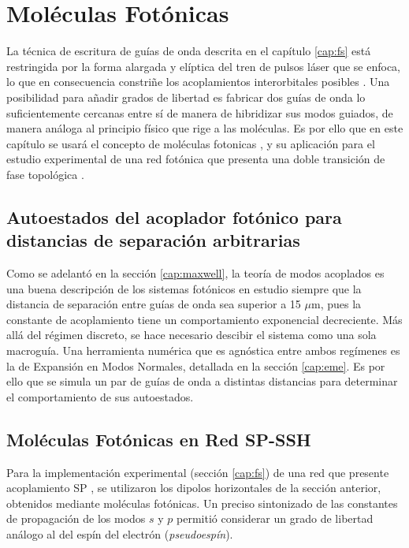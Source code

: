 \chapter{Moléculas Fotónicas}

La técnica de escritura de guías de onda descrita en el capítulo \ref{cap:fs} está restringida por la forma alargada y elíptica del tren de pulsos láser que se enfoca, lo que en consecuencia constriñe los acoplamientos interorbitales posibles \citep{interorbital}. Una posibilidad para añadir grados de libertad es fabricar dos guías de onda lo suficientemente cercanas entre sí de manera de hibridizar sus modos guiados, de manera análoga al principio físico que rige a las moléculas. Es por ello que en este capítulo se usará el concepto de moléculas fotonicas \citep{molecules}, y su aplicación para el estudio experimental de una red fotónica que presenta una doble transición de fase topológica \citep{SPSSH}.

\section{Autoestados del acoplador fotónico para distancias de separación arbitrarias}

Como se adelantó en la sección \ref{cap:maxwell}, la teoría de modos acoplados es una buena descripción de los sistemas fotónicos en estudio siempre que la distancia de separación entre guías de onda sea superior a 15 $\mu$m, pues la constante de acoplamiento tiene un comportamiento exponencial decreciente. Más allá del régimen discreto, se hace necesario descibir el sistema como una sola macroguía. Una herramienta numérica que es agnóstica entre ambos regímenes es la de Expansión en Modos Normales, detallada en la sección \ref{cap:eme}. Es por ello que se simula un par de guías de onda a distintas distancias para determinar el comportamiento de sus autoestados. 

\section{Moléculas Fotónicas en Red SP-SSH}

Para la implementación experimental (sección \ref{cap:fs}) de una red que presente acoplamiento SP \citep{interorbital, SPSSH}, se utilizaron los dipolos horizontales de la sección anterior, obtenidos mediante moléculas fotónicas. Un preciso sintonizado de las constantes de propagación de los modos $s$ y $p$ permitió considerar un grado de libertad análogo al del espín del electrón (\textit{pseudoespín}). 

